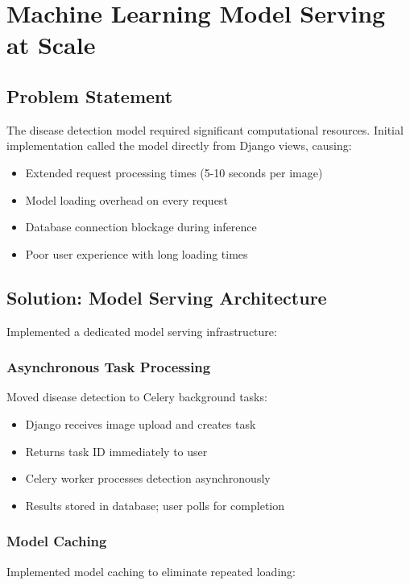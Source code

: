 \documentclass[12pt,a4paper]{report}
\begin{document}
\section{Machine Learning Model Serving at Scale}

\subsection{Problem Statement}

The disease detection model required significant computational resources. Initial implementation called the model directly from Django views, causing:
\begin{itemize}
    \item Extended request processing times (5-10 seconds per image)
    \item Model loading overhead on every request
    \item Database connection blockage during inference
    \item Poor user experience with long loading times
\end{itemize}

\subsection{Solution: Model Serving Architecture}

Implemented a dedicated model serving infrastructure:

\subsubsection{Asynchronous Task Processing}

Moved disease detection to Celery background tasks:
\begin{itemize}
    \item Django receives image upload and creates task
    \item Returns task ID immediately to user
    \item Celery worker processes detection asynchronously
    \item Results stored in database; user polls for completion
\end{itemize}

\subsubsection{Model Caching}

Implemented model caching to eliminate repeated loading:
\end{document}
